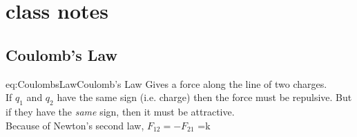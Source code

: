 \chapter{class notes}
    \section{Coulomb's Law}
    \begin{eqboxed}{eq:CoulombsLaw}{Coulomb's Law}
    {Gives a force along the line of two charges. \\ If \(q_1\) and \(q_2\) have the same sign (i.e. charge) then the force must be repulsive. But if they have the \textit{same} sign, then it must be attractive.\\ 
    Because of Newton's second law, \(F_{12} = -F_{21}\)}
     =k 
    \end{eqboxed}

